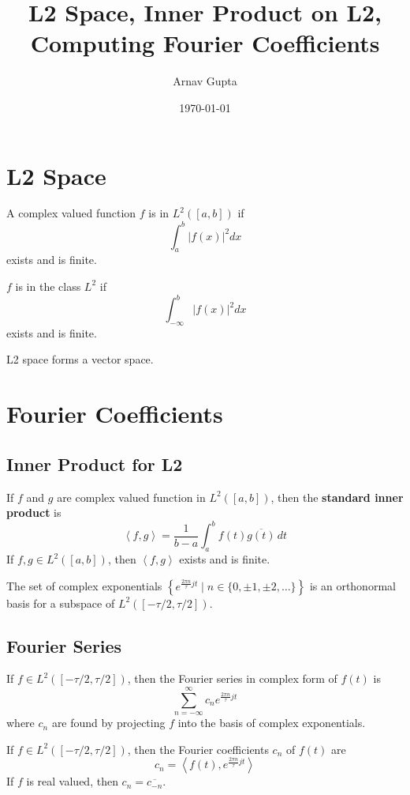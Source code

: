 \documentclass[11pt]{article}
\author{Arnav Gupta}
\date{\today}
\title{L2 Space, Inner Product on L2, Computing Fourier Coefficients}
\begin{document}
\maketitle
\tableofcontents

\section{L2 Space}
\label{sec:org0976715}
A complex valued function \(f\) is in \(L^{2}([a,b])\) if
$$
\int_{a}^{b} |f(x)|^{2} dx
$$
exists and is finite.

\(f\) is in the class \(L^{2}\) if
$$
\int_{-\infty}^{b} |f(x)|^{2} dx
$$
exists and is finite.

L2 space forms a vector space.
\section{Fourier Coefficients}
\label{sec:org3cef6be}
\subsection{Inner Product for L2}
\label{sec:org741dee4}
If \(f\) and \(g\) are complex valued function in \(L^{2}([a,b])\), then the \textbf{standard inner product} is
$$
\left< f,g \right> = \frac{1}{b-a} \int_{a}^{b} f(t) \overline{g(t)}\, dt
$$
If \(f,g \in L^{2}([a,b])\), then \(\left< f,g \right>\) exists and is finite.

The set of complex exponentials
\(\left\{e^{\frac{2\pi n}{\tau}jt} \mid n \in \{0, \pm 1, \pm 2, \dots\}\right\}\) is an
orthonormal basis for a subspace of \(L^{2}([-\tau/2,\tau/2])\).
\subsection{Fourier Series}
\label{sec:org243cd91}
If \(f \in L^{2}([-\tau/2,\tau/2])\), then the Fourier series in complex form of \(f(t)\) is
$$
\sum_{n = -\infty}^{\infty} c_{n} e^{\frac{2\pi n}{\tau}jt}
$$
where \(c_{n}\) are found by projecting \(f\) into the basis of complex exponentials.

If \(f \in L^{2}([-\tau/2,\tau/2])\), then the Fourier coefficients \(c_{n}\) of \(f(t)\) are
$$
c_{n} = \left< f(t), e^{\frac{2\pi n}{\tau}jt} \right>
$$
If \(f\) is real valued, then \(c_{n} = \overline{c_{-n}}\).
\end{document}
